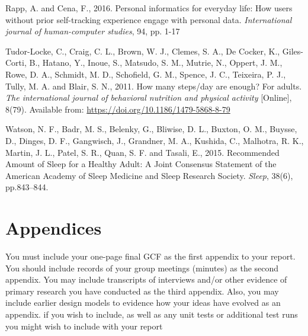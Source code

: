\documentclass[12pt]{article}
\begin{document}
\begin{thebibliography}{99}
    Rapp, A. and Cena, F., 2016. Personal informatics for everyday life: 
    How users without prior self-tracking experience engage with personal data. 
    \textit{International journal of human-computer studies}, 94, pp. 1-17

    Tudor-Locke, C., Craig, C. L., Brown, W. J., Clemes, S. A., De Cocker, K., 
    Giles-Corti, B., Hatano, Y., Inoue, S., Matsudo, S. M., Mutrie, N., Oppert, J. M., Rowe, D. A., 
    Schmidt, M. D., Schofield, G. M., Spence, J. C., Teixeira, P. J., Tully, M. A. and Blair, S. N., 2011. 
    How many steps/day are enough? For adults. 
    \textit{The international journal of behavioral nutrition and physical activity} 
    [Online], 8(79). Available from: \url{https://doi.org/10.1186/1479-5868-8-79}

    Watson, N. F., Badr, M. S., Belenky, G., Bliwise, D. L., Buxton, O. M., Buysse, D., 
    Dinges, D. F., Gangwisch, J., Grandner, M. A., Kushida, C., Malhotra, R. K., Martin, J. L., Patel, S. R., 
    Quan, S. F. and Tasali, E., 2015. 
    Recommended Amount of Sleep for a Healthy Adult: 
    A Joint Consensus Statement of the American Academy of Sleep Medicine and Sleep Research Society. 
    \textit{Sleep}, 38(6), pp.843–844.
\end{thebibliography}


\section{Appendices}
You must include your one-page final GCF as the first appendix to your report. You should
include records of your group meetings (minutes) as the second appendix. You may include
transcripts of interviews and/or other evidence of primary research you have conducted as
the third appendix.
Also, you may include earlier design models to evidence how your ideas have evolved as an
appendix. if you wish to include, as well as any unit tests or additional test runs you might
wish to include with your report
\end{document}
